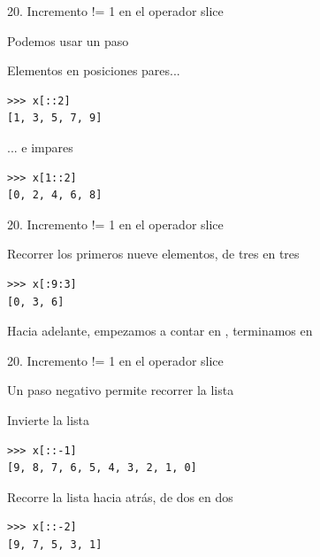 \documentclass[14pt]{beamer}
\begin{document}
\begin{frame}[fragile]{20. Incremento != 1 en el operador slice}
  \begin{block}{}
    \large
    \centering
    Podemos usar un paso 
  \end{block}

  \small
  \begin{exampleblock}
    {Elementos en posiciones pares...}
    \begin{lstlisting}
>>> x[::2]
[1, 3, 5, 7, 9]
    \end{lstlisting}
  \end{exampleblock}

  \begin{exampleblock}
    {... e impares}
    \begin{lstlisting}
>>> x[1::2]
[0, 2, 4, 6, 8]
    \end{lstlisting}
  \end{exampleblock}
\end{frame}

\begin{frame}[fragile]{20. Incremento != 1 en el operador slice}
  \begin{exampleblock}
    {Recorrer los primeros nueve elementos, de tres en tres}
    \begin{lstlisting}
>>> x[:9:3]
[0, 3, 6]
    \end{lstlisting}
  \end{exampleblock}

  \begin{alertblock}{}
    \small
    \centering
    Hacia adelante, empezamos a contar en , terminamos
    en 
  \end{alertblock}
\end{frame}

\begin{frame}[fragile]{20. Incremento != 1 en el operador slice}
  \begin{block}{}
    \centering
    Un paso negativo permite recorrer la lista 
  \end{block}

  \small
  \begin{exampleblock}
    {Invierte la lista}
    \begin{lstlisting}
>>> x[::-1]
[9, 8, 7, 6, 5, 4, 3, 2, 1, 0]
    \end{lstlisting}
  \end{exampleblock}

  \begin{exampleblock}
    {Recorre la lista hacia atrás, de dos en dos}
    \begin{lstlisting}
>>> x[::-2]
[9, 7, 5, 3, 1]
    \end{lstlisting}
  \end{exampleblock}
\end{frame}
\end{document}
